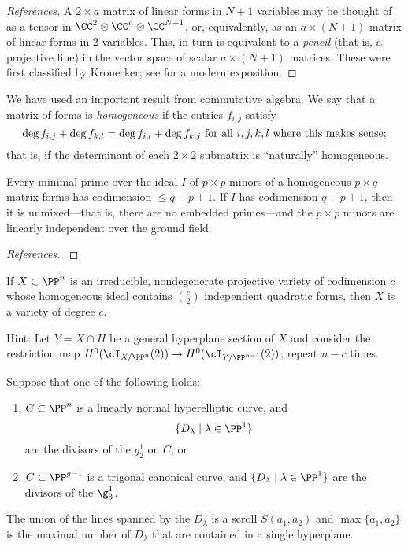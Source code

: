 \begin{proof}[References]
A $2\times a$ matrix of linear forms in $N+1$ variables may be thought of as a tensor
in $\CC^{2}\otimes \CC^{a}\otimes \CC^{N+1}$, or, equivalently, as an $a\times (N+1)$ matrix of linear forms in 2 variables. This, in turn is equivalent to a \emph{pencil} (that is, a projective line) in the vector space of scalar $a\times (N+1)$ matrices. These were first classified by Kronecker; see 
\cite[Theorems *** and ***]{Gantmacher} for a modern exposition. 
\end{proof}


We have used an important result from commutative algebra.
We say that a matrix of forms is \emph{homogeneous} if the entries $f_{i,j}$ satisfy
$$
\deg f_{i,j} + \deg f_{k,l} = \deg f_{i,l}+\deg f_{k,j} \hbox{ for all } i,j,k,l \hbox{ where this makes sense;}
$$
that is, if the determinant of each $2\times 2$ submatrix is ``naturally'' homogeneous.

\begin{fact}\label{Macaulay's Theorem} Every minimal prime over the ideal $I$ of $p\times p$ minors of a homogeneous $p\times q$ matrix forms has codimension $\leq q-p+1$. If $I$ has codimension $q-p+1$, then it is unmixed---that is, there are no embedded primes---and the $p\times p$ minors are linearly independent over the ground field.
\end{fact}

\begin{proof}[References] 
\cite[ Theorem *** ]{Eisenbud1995}
\end{proof}

\begin{exercise}\label{many quadrics}
 If $X \subset \PP^n$ is an irreducible, nondegenerate projective variety of codimension $c$ whose homogeneous ideal
 contains ${c\choose 2}$ independent quadratic forms, then $X$ is a variety of degree $c$.
 
Hint: Let $Y = X \cap H$ be a general hyperplane section of $X$ and consider the restriction map $H^0(\cI_{X/\PP^n}(2)) \to H^0(\cI_{Y/\PP^{n-1}}(2))$; repeat $n-c$ times.
\end{exercise}

\begin{corollary}\label{hyperelliptic and trigonal} Suppose that one of the following holds:
\begin{enumerate}
 \item  $C\subset \PP^n$ is a linearly normal hyperelliptic curve, and  
$$
\{D_\lambda \mid \lambda \in \PP^1\}
$$
are the divisors of the $g^1_2$ on $C$; or

\item $C\subset \PP^{g-1}$ is a trigonal canonical curve, and  
$\{D_\lambda \mid \lambda \in \PP^1\}$
are the divisors of the $\g^1_3$.
\end{enumerate}

The union of the lines spanned by the $D_\lambda$
is a scroll $S(a_1,a_2)$ and $\max\{a_1, a_2\}$ is the maximal number of
$D_\lambda$ that are contained in a single hyperplane.
\end{corollary}

